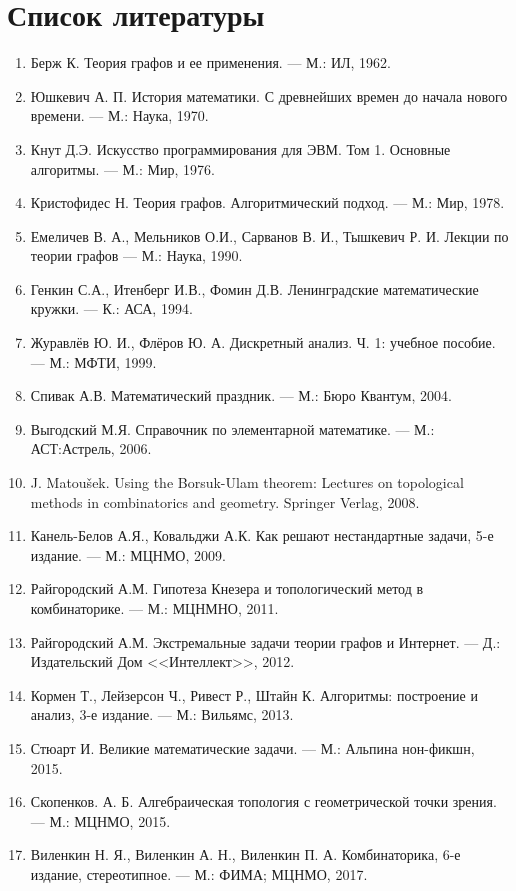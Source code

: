 \sloppy
\chapter*{Список литературы}
\begin{enumerate}
\item Берж К. Теория графов и ее применения. --- М.: ИЛ, 1962.
\item Юшкевич А. П. История математики. С древнейших времен до начала нового времени. --- М.: Наука, 1970.
\item Кнут Д.Э. Искусство программирования для ЭВМ. Том 1. Основные алгоритмы. --- М.: Мир, 1976.
\item Кристофидес Н. Теория графов. Алгоритмический подход. --- М.: Мир, 1978.
\item Емеличев В. А., Мельников О.И., Сарванов В. И., Тышкевич Р. И. Лекции по теории графов --- М.: Наука, 1990.
\item Генкин С.А., Итенберг И.В., Фомин Д.В. Ленинградские математические кружки. --- К.: АСА, 1994.
\item Журавлёв Ю. И., Флёров Ю. А. Дискретный анализ. Ч. 1: учебное пособие. --- М.: МФТИ, 1999.
\item Спивак А.В. Математический праздник. --- М.: Бюро Квантум, 2004.
\item Выгодский М.Я. Справочник по элементарной математике. --- М.: АСТ:Астрель, 2006.
\item J. Matoušek. Using the Borsuk-Ulam theorem: Lectures on topological methods in combinatorics and geometry. Springer Verlag, 2008.
\item Канель-Белов А.Я., Ковальджи А.К. Как решают нестандартные задачи, 5-е издание. --- М.: МЦНМО, 2009.
\item Райгородский А.М. Гипотеза Кнезера и топологический метод в комбинаторике. --- М.: МЦНМНО, 2011.
\item Райгородский А.М. Экстремальные задачи теории графов и Интернет. --- Д.: Издательский Дом <<Интеллект>>, 2012.
\item Кормен Т., Лейзерсон Ч., Ривест Р., Штайн К. Алгоритмы: построение и анализ, 3-е издание. --- М.: Вильямс, 2013.
\item Стюарт И. Великие математические задачи. --- М.: Альпина нон-фикшн, 2015.
\item Скопенков. А. Б. Алгебраическая топология с геометрической точки зрения. --- М.: МЦНМО, 2015.
\item Виленкин Н. Я., Виленкин А. Н., Виленкин П. А. Комбинаторика, 6-е издание, стереотипное. --- М.: ФИМА; МЦНМО, 2017. 

\end{enumerate}
